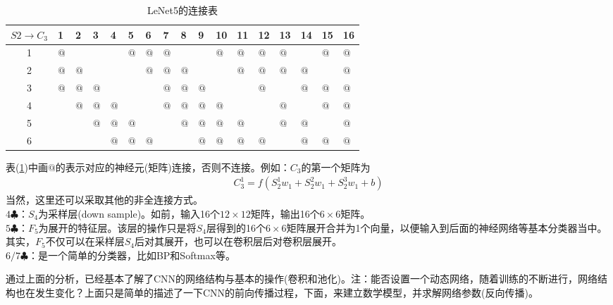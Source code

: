             \begin{table}[htbp]
              \caption{LeNet5的连接表}
              \label{tab:LeNet5的连接表}
              \centering
              \begin{tabular}{c|llllllllllllllll}
              \toprule
              $S2\to C_3$&1  &2 &3  &4  &5  &6  &7  &8  &9  &10 &11 &12 &13 &14 &15 &16 \\
              \midrule
              1          &$@$ &  &   &   &$@$ &$@$ &$@$ &   &   &$@$ &$@$ &$@$ &$@$ &   &$@$ &$@$\\
              2          &$@$ &$@$&   &   &   &$@$ &$@$ &$@$ &   &   &$@$ &$@$ &$@$ &$@$ &   &$@$\\
              3          &$@$ &$@$&$@$ &   &   &   &$@$ &$@$ &$@$ &   &   &$@$ &   &$@$ &$@$ &$@$\\
              4          &   &$@$&$@$ &$@$ &   &   &$@$ &$@$ &$@$ &$@$ &   &   &$@$ &   &$@$ &$@$\\
              5          &   &  &$@$ &$@$ &$@$ &   &   &$@$ &$@$ &$@$ &$@$ &   &$@$ &$@$ &   &$@$\\
              6          &   &  &   &$@$ &$@$ &$@$ &   &   &$@$ &$@$ &$@$ &$@$ &   &$@$ &$@$ &$@$\\
              \bottomrule
              \end{tabular}
            \end{table}
            表(\ref{tab:LeNet5的连接表})中画$@$的表示对应的神经元(矩阵)连接，否则不连接。例如：$C_3$的第一个矩阵为
            \begin{align*}
            C_3^1 = f(S_2^1 w_1 + S_2^2 w_1 + S_2^3 w_1 + b)
            \end{align*}
            当然，这里还可以采取其他的非全连接方式。\\
            $4\clubsuit$：$S_4$为采样层(down sample)。如前，输入16个$12\times 12$矩阵，输出16个$6\times 6$矩阵。\\
            $5\clubsuit$：$F_5$为展开的特征层。该层的操作只是将$S_4$层得到的16个$6\times 6$矩阵展开合并为1个向量，以便输入到后面的神经网络等基本分类器当中。其实，$F_5$不仅可以在采样层$S_4$后对其展开，也可以在卷积层后对卷积层展开。\\
            $6/7\clubsuit$：是一个简单的分类器，比如BP和Softmax等。
            \par
            通过上面的分析，已经基本了解了CNN的网络结构与基本的操作(卷积和池化)。注：能否设置一个动态网络，随着训练的不断进行，网络结构也在发生变化？上面只是简单的描述了一下CNN的前向传播过程，下面，来建立数学模型，并求解网络参数(反向传播)。
